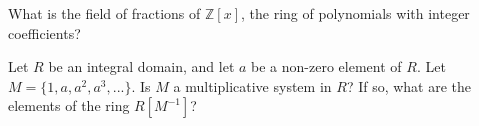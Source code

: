 \documentclass[12pt,letterpaper,boxed]{hmcpset}
\begin{document}
\begin{solution}

\end{solution}

\clearpage

\begin{problem}[17.1.4]
What is the field of fractions of $\mathbb{Z}[x]$, the ring of polynomials with integer coefficients?
\end{problem}

\begin{solution}
\end{solution}

\clearpage

\begin{problem}[17.1.12]
Let $R$ be an integral domain, and let $a$ be a non-zero element of $R$. Let $M = \{1, a, a^2, a^3,...\}$. Is $M$ a multiplicative system in $R$? If so, what are the elements of the ring $R[M^{-1}]$?
\end{problem}

\begin{solution}
\end{solution}
\end{document}
